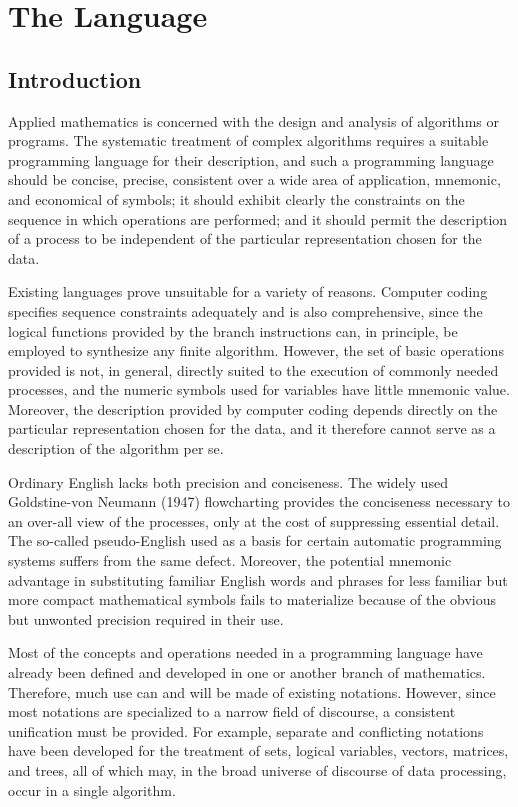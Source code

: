 
\chapter{The Language}

\section{Introduction}

\par Applied mathematics is concerned with the design and analysis of algorithms or programs. The systematic treatment of complex algorithms requires a suitable programming language for their description, and such a programming language should be concise, precise, consistent over a wide area of application, mnemonic, and economical of symbols; it should exhibit clearly the constraints on the sequence in which operations are performed; and it should permit the description of a process to be independent of the particular representation chosen for the data.

\par Existing languages prove unsuitable for a variety of reasons. Computer coding specifies sequence constraints adequately and is also comprehensive, since the logical functions provided by the branch instructions can, in principle, be employed to synthesize any finite algorithm. However, the set of basic operations provided is not, in general, directly suited to the execution of commonly needed processes, and the numeric symbols used for variables have little mnemonic value. Moreover, the description provided by computer coding depends directly on the particular representation chosen for the data, and it therefore cannot serve as a description of the algorithm per se.

\par Ordinary English lacks both precision and conciseness. The widely used Goldstine-von Neumann (1947) flowcharting provides the conciseness necessary to an over-all view of the processes, only at the cost of suppressing essential detail. The so-called pseudo-English used as a basis for certain automatic programming systems suffers from the same defect. Moreover, the potential mnemonic advantage in substituting familiar English words and phrases for less familiar but more compact mathematical symbols fails to materialize because of the obvious but unwonted precision required in their use.

\par Most of the concepts and operations needed in a programming language have already been defined and developed in one or another branch of mathematics. Therefore, much use can and will be made of existing notations. However, since most notations are specialized to a narrow field of discourse, a consistent unification must be provided. For example, separate and conflicting notations have been developed for the treatment of sets, logical variables, vectors, matrices, and trees, all of which may, in the broad universe of discourse of data processing, occur in a single algorithm.

